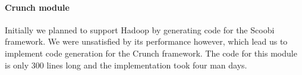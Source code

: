 
\paragraph{Crunch module}
Initially we planned to support Hadoop by generating code for the Scoobi
framework. We were unsatisfied by its performance however, which lead us to
implement code generation for the Crunch framework. The code for this module is
only 300 lines long and the implementation took four man days.
